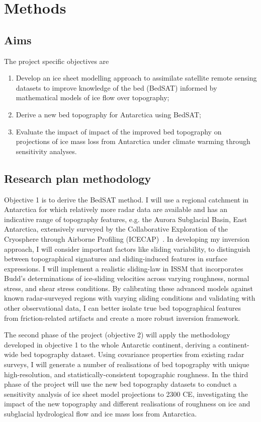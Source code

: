 \chapter{Methods}
\section{Aims}

The project specific objectives are 
\begin{enumerate}
    \item Develop an ice sheet modelling approach to assimilate satellite remote sensing datasets to improve knowledge of the bed (BedSAT) informed by mathematical models of ice flow over topography;
    \item Derive a new bed topography for Antarctica using BedSAT;
    \item Evaluate the impact of impact of the improved bed topography on projections of ice mass loss from Antarctica under climate warming through sensitivity analyses. 
\end{enumerate}

\section{Research plan methodology}

Objective 1 is to derive the BedSAT method. I will use a regional catchment in Antarctica for which relatively more radar data are available and has an indicative range of topography features, e.g. the Aurora Subglacial Basin, East Antarctica, extensively surveyed by the Collaborative Exploration of the Cryosphere through Airborne Profiling (ICECAP)~\cite{Young_2011}. In developing my inversion approach, I will consider important factors like sliding variability, to distinguish between topographical signatures and sliding-induced features in surface expressions. I will implement a realistic sliding-law in ISSM that incorporates Budd's  determinations of ice-sliding velocities across varying roughness, normal stress, and shear stress conditions. By calibrating these advanced models against known radar-surveyed regions with varying sliding conditions and validating with other observational data, I can better isolate true bed topographical features from friction-related artifacts and create a more robust inversion framework.

The second phase of the project (objective 2) will apply the methodology developed in objective 1 to the whole Antarctic continent, deriving a continent-wide bed topography dataset. Using covariance properties from existing radar surveys, I will generate a number of realisations of bed topography with unique high-resolution, and statistically-consistent topographic roughness. In the third phase of the project will use the new bed topography datasets to conduct a sensitivity analysis of ice sheet model projections to 2300 CE, investigating the impact of the new topography and different realisations of roughness on ice and subglacial hydrological flow and ice mass loss from Antarctica.


